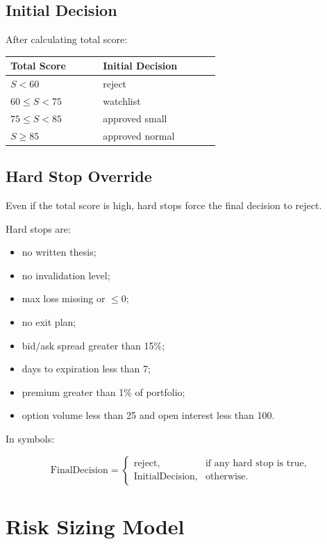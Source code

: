 \documentclass[11pt]{article}
\begin{document}
\subsection{Initial Decision}

After calculating total score:

\begin{longtable}{p{0.25\linewidth} p{0.35\linewidth}}
\toprule
\textbf{Total Score} & \textbf{Initial Decision} \\
\midrule
\(S < 60\) & reject \\
\(60 \le S < 75\) & watchlist \\
\(75 \le S < 85\) & approved small \\
\(S \ge 85\) & approved normal \\
\bottomrule
\end{longtable}

\subsection{Hard Stop Override}

Even if the total score is high, hard stops force the final decision to reject.

Hard stops are:

\begin{itemize}[noitemsep]
  \item no written thesis;
  \item no invalidation level;
  \item max loss missing or \(\le 0\);
  \item no exit plan;
  \item bid/ask spread greater than 15\%;
  \item days to expiration less than 7;
  \item premium greater than 1\% of portfolio;
  \item option volume less than 25 and open interest less than 100.
\end{itemize}

In symbols:

\begin{equation}
\text{FinalDecision} =
\begin{cases}
\text{reject}, & \text{if any hard stop is true}, \\
\text{InitialDecision}, & \text{otherwise}.
\end{cases}
\end{equation}

\section{Risk Sizing Model}
\end{document}

